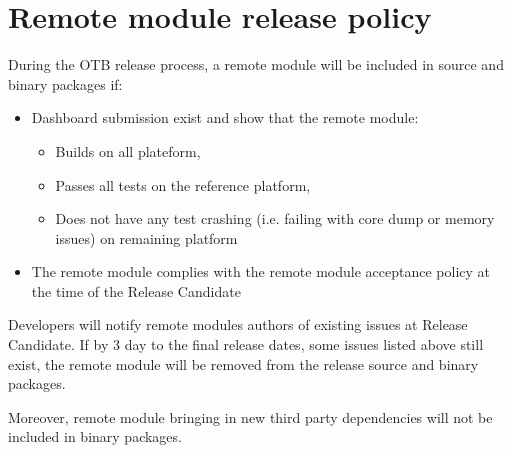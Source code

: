 \section{Remote module release policy }

During the OTB release process, a remote module will be included in source and binary packages if:
\begin{itemize}
    \item Dashboard submission exist and show that the remote module:
    \begin{itemize}
        \item Builds on all plateform,
        \item Passes all tests on the reference platform,
        \item Does not have any test crashing (i.e. failing with core dump or memory issues) on remaining platform 
    \end{itemize}
    \item The remote module complies with the remote module acceptance policy at the time of the Release Candidate 
\end{itemize}
Developers will notify remote modules authors of existing issues at Release Candidate. If by 3 day to the final release dates, some issues listed above still exist, the remote module will be removed from the release source and binary packages.

Moreover, remote module bringing in new third party dependencies will not be included in binary packages. 

